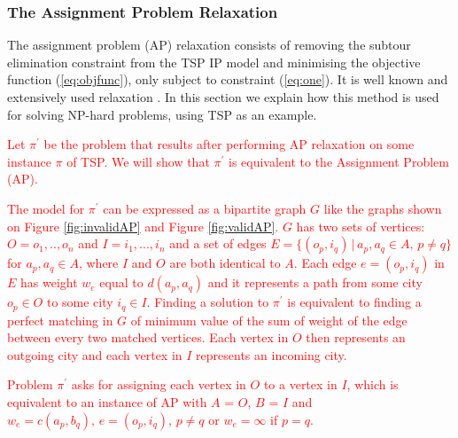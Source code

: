 \documentclass{mprop}
\theoremstyle{definition}
\begin{document}
\subsubsection{The Assignment Problem Relaxation}


The assignment problem (AP) relaxation consists of removing the subtour elimination constraint from the TSP IP model and minimising the objective function (\ref{eq:objfunc}), only subject to constraint (\ref{eq:one}). It is well known and extensively used relaxation \cite{Little63,Eastman58,Bellmore71,Baker83,Laporte86}. In this section we explain how this method is used for solving NP-hard problems, using TSP as an example.

\textcolor{red}{
Let $\pi^{\prime}$ be the problem that results after performing AP relaxation on some instance $\pi$ of TSP. We will show that $\pi^{\prime}$ is equivalent to the Assignment Problem (AP).
}

\textcolor{red}{
The model for $\pi^{\prime}$ can be expressed as a bipartite graph $G$ like the graphs shown on Figure \ref{fig:invalidAP} and Figure \ref{fig:validAP}. $G$ has two sets of vertices: $O = o_{1},..,o_{n}$ and $I = i_{1},...,i_{n}$ and a set of edges $E = \{(o_{p}, i_{q}) \,|\, a_{p},a_{q} \in A,\, p \neq q \}$ for $a_{p},a_{q} \in A$, where $I$ and $O$ are both identical to $A$. Each edge $e = (o_{p}, i_{q})$ in $E$ has weight $w_{e}$ equal to $d(a_{p},a_{q})$ and it represents a path from some city $o_{p} \in O$ to some city $i_{q} \in I$. Finding a solution to $\pi^{\prime}$ is equivalent to finding a perfect matching in $G$ of minimum value of the sum of weight of the edge between every two matched vertices. Each vertex in $O$ then represents an outgoing city and each vertex in $I$ represents an incoming city.
}

\textcolor{red}{
Problem $\pi^{\prime}$ asks for assigning each vertex in $O$ to a vertex in $I$, which is equivalent to an instance of AP with $A$ = $O$, $B$ = $I$ and $w_{e} = c(a_{p},b_{q}), \, e = (o_{p}, i_{q}), \, p \neq q$ or $w_{e} = \infty$ if $p = q$.
}
\end{document}
